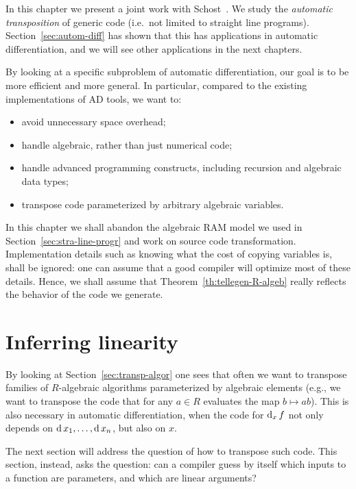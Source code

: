 In this chapter we present a joint work with
Schost~\cite{df+schost10}. We study the
\emph{automatic transposition} of
generic code (i.e.\ not limited to straight line programs).
Section~\ref{sec:autom-diff} has shown that this has applications in
automatic differentiation, and we will see other applications in the
next chapters.

By looking at a specific subproblem of automatic differentiation, our
goal is to be more efficient and more general. In particular, compared
to the existing implementations of AD tools, we want to:
\begin{itemize}
\item avoid unnecessary space overhead;
\item handle algebraic, rather than just numerical code;
\item handle advanced programming constructs, including recursion and
  algebraic data types;
\item transpose code parameterized by arbitrary algebraic variables.
\end{itemize}

In this chapter we shall abandon the algebraic RAM model we used in
Section~\ref{sec:stra-line-progr} and work on source code
transformation. Implementation details such as knowing what the cost
of copying variables is, shall be ignored: one can assume that a good
compiler will optimize most of these details. Hence, we shall assume
that Theorem~\ref{th:tellegen-R-algeb} really reflects the behavior of
the code we generate.


\section{Inferring linearity}
\label{sec:inference}
\lstset{language=haskell}

By looking at Section~\ref{sec:transp-algor} one sees that often we
want to transpose families of $R$-algebraic algorithms parameterized
by algebraic elements (e.g., we want to transpose the code that for
any $a\in R$ evaluates the map $b\mapsto ab$). This is also necessary
in automatic differentiation, when the code for $\operatorname{d}_x f$ not only
depends on $\operatorname{d} x_1,\ldots,\operatorname{d} x_n$, but also on $x$.

The next section will address the question of how to transpose such
code. This section, instead, asks the question: can a compiler guess
by itself which inputs to a function are parameters, and which are
linear arguments?

